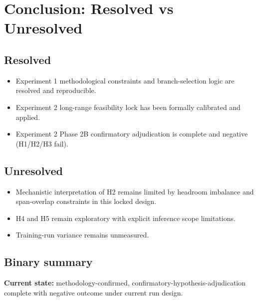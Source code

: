 \documentclass[11pt]{article}
\begin{document}
\section{Conclusion: Resolved vs Unresolved}
\subsection*{Resolved}
\begin{itemize}[leftmargin=*]
  \item Experiment 1 methodological constraints and branch-selection logic are resolved and reproducible.
  \item Experiment 2 long-range feasibility lock has been formally calibrated and applied.
  \item Experiment 2 Phase 2B confirmatory adjudication is complete and negative (H1/H2/H3 fail).
\end{itemize}

\subsection*{Unresolved}
\begin{itemize}[leftmargin=*]
  \item Mechanistic interpretation of H2 remains limited by headroom imbalance and span-overlap constraints in this locked design.
  \item H4 and H5 remain exploratory with explicit inference scope limitations.
  \item Training-run variance remains unmeasured.
\end{itemize}

\subsection*{Binary summary}
\textbf{Current state:} methodology-confirmed, confirmatory-hypothesis-adjudication complete with negative outcome under current run design.
\end{document}
